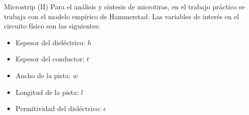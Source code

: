 \documentclass[9pt]{beamer}
\begin{document}
	\begin{frame}{Microstrip (II)}
		Para el análisis y síntesis de microtiras, en el trabajo práctico se trabaja con el modelo empírico de Hammerstad. Las variables de interés en el circuito físico son las siguientes:
		
		\begin{itemize}
			\item Espesor del dieléctrico: $h$
			\item Espesor del conductor: $t$
			\item Ancho de la pista: $w$
			\item Longitud de la pista: $l$
			\item Permitividad del dieléctrico: $\epsilon$
		\end{itemize}
		
	\end{frame}
	
\end{document}
